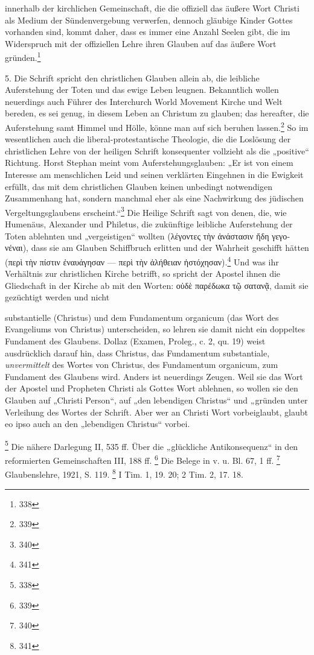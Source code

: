 innerhalb der kirchlichen Gemeinschaft, die die offiziell das äußere Wort Christi als Medium der Sündenvergebung verwerfen, dennoch gläubige Kinder Gottes vorhanden sind, kommt daher, dass es immer eine Anzahl Seelen gibt, die im Widerspruch mit der offiziellen Lehre ihren Glauben auf das äußere Wort gründen.\footnote{338}

5. Die Schrift spricht den christlichen Glauben allein ab, die leibliche Auferstehung der Toten und das ewige Leben leugnen. Bekanntlich wollen neuerdings auch Führer des Interchurch World Movement Kirche und Welt bereden, es sei genug, in diesem Leben an Christum zu glauben; das hereafter, die Auferstehung samt Himmel und Hölle, könne man auf sich beruhen lassen.\footnote{339} So im wesentlichen auch die liberal-protestantische Theologie, die die Loslösung der christlichen Lehre von der heiligen Schrift konsequenter vollzieht als die „positive“ Richtung. Horst Stephan meint vom Auferstehungsglauben: „Er ist von einem Interesse am menschlichen Leid und seinen verklärten Eingehnen in die Ewigkeit erfüllt, das mit dem christlichen Glauben keinen unbedingt notwendigen Zusammenhang hat, sondern manchmal eher als eine Nachwirkung des jüdischen Vergeltungsglaubens erscheint.“\footnote{340} Die Heilige Schrift sagt von denen, die, wie Humenäus, Alexander und Philetus, die zukünftige leibliche Auferstehung der Toten ablehnten und „vergeistigen“ wollten (\textgreek{λέγοντες τὴν ἀνάστασιν ἤδη γεγονέναι}), dass sie am Glauben Schiffbruch erlitten und der Wahrheit geschifft hätten (\textgreek{περὶ τὴν πίστιν ἐναυάγησαν} --- \textgreek{περὶ τὴν ἀλήθειαν ἠστόχησαν}).\footnote{341} Und was ihr Verhältnis zur christlichen Kirche betrifft, so spricht der Apostel ihnen die Gliedschaft in der Kirche ab mit den Worten: \textgreek{οὐδὲ παρέδωκα τῷ σατανᾷ}, damit sie gezüchtigt werden und nicht

substantielle (Christus) und dem Fundamentum organicum (das Wort des Evangeliums von Christus) unterscheiden, so lehren sie damit nicht ein doppeltes Fundament des Glaubens. Dollaz (Examen, Proleg., c. 2, qu. 19) weist ausdrücklich darauf hin, dass Christus, das Fundamentum substantiale, \emph{unvermittelt} des Wortes von Christus, des Fundamentum organicum, zum Fundament des Glaubens wird. Anders ist neuerdings Zeugen. Weil sie das Wort der Apostel und Propheten Christi als Gottes Wort ablehnen, so wollen sie den Glauben auf „Christi Person“, auf „den lebendigen Christus“ und „gründen unter Verleihung des Wortes der Schrift. Aber wer an Christi Wort vorbeiglaubt, glaubt eo ipso auch an den „lebendigen Christus“ vorbei.

\footnote{338} Die nähere Darlegung II, 535 ff. Über die „glückliche Antikonsequenz“ in den reformierten Gemeinschaften III, 188 ff.
\footnote{339} Die Belege in v. u. Bl. 67, 1 ff.
\footnote{340} Glaubenslehre, 1921, S. 119.
\footnote{341} I Tim. 1, 19. 20; 2 Tim. 2, 17. 18.